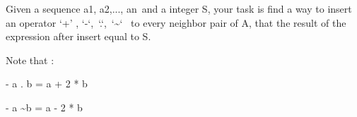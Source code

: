 Given a sequence a1, a2,..., an and a integer S, your task is find a way to insert an operator ‘+’ , ‘-‘, ‘.‘, ‘\textasciitilde‘  to every neighbor pair of A, that the result of the expression after insert equal to S.

Note that :


- a . b = a + 2 * b


- a \textasciitilde b = a - 2 * b